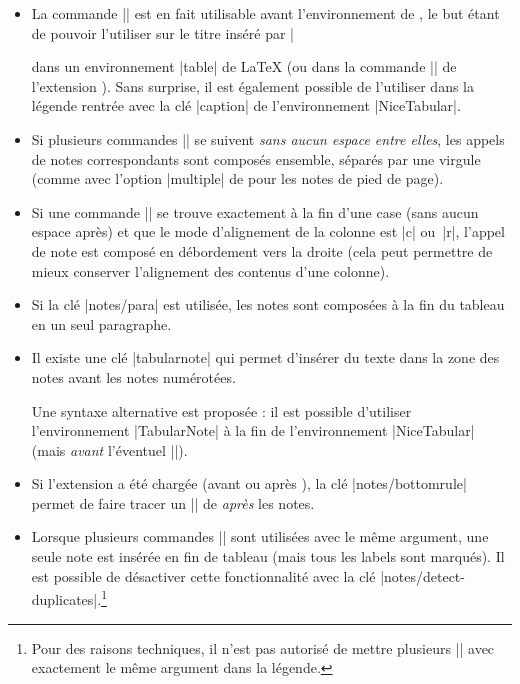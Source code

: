 \documentclass[dvipsnames]{article}%
\begin{document}
\medskip
\begin{itemize}
\item La commande |\tabularnote| est en fait utilisable avant
l'environnement de , le but étant de pouvoir l'utiliser sur le
titre inséré par |\caption| dans un environnement |{table}| de LaTeX (ou dans la
commande |\captionof| de l'extension ). Sans surprise, il est
également possible de l'utiliser dans la légende rentrée avec la clé |caption|
de l'environnement |{NiceTabular}|.

\item Si plusieurs commandes || se suivent \emph{sans aucun espace
  entre elles}, les appels de notes correspondants sont composés ensemble,
séparés par une virgule (comme avec l'option |multiple| de  pour
les notes de pied de page).

\item Si une commande || se trouve exactement à la fin d'une
case (sans aucun espace après) et que le mode d'alignement de la colonne est |c|
ou~|r|, l'appel de note est composé en débordement vers la droite (cela peut
permettre de mieux conserver l'alignement des contenus d'une colonne).

\item Si la clé |notes/para| est utilisée, les notes sont composées à la fin du
tableau en un seul paragraphe.

\item {}
Il existe une clé |tabularnote| qui permet d'insérer du texte dans la zone
des notes avant les notes numérotées.


Une syntaxe alternative est proposée : il est possible d'utiliser
l'environnement |{TabularNote}| à la fin de l'environnement |{NiceTabular}|
(mais \emph{avant} l'éventuel |\CodeAfter|).

\item Si l'extension  a été chargée (avant ou après
), la clé |notes/bottomrule| permet de faire tracer un
|\bottomrule| de  \emph{après} les notes.

\item Lorsque plusieurs commandes |\tabularnote| sont utilisées avec le même
argument, une seule note est insérée en fin de tableau (mais tous les labels
sont marqués). Il est possible de désactiver cette fonctionnalité avec la clé
|notes/detect-duplicates|.\footnote{Pour des raisons techniques, il n'est pas
  autorisé de mettre plusieurs |\tabularnote| avec exactement le même argument
  dans la légende.}


\end{itemize}
\end{document}
